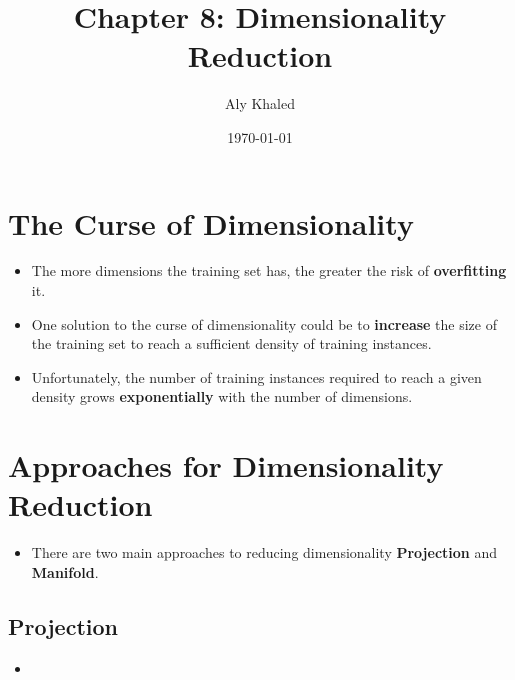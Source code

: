 \documentclass{article}
\title{Chapter 8: Dimensionality Reduction}
\author{Aly Khaled}
\date{\today}
\begin{document}
 
    \maketitle
    \section{The Curse of Dimensionality}
    \begin{itemize}
    	\item The more dimensions the training set has, the greater the risk of \textbf{overfitting} it.
    	\item One solution to the curse of dimensionality could be to \textbf{increase} the size of the training set to reach a sufficient density of training instances.
    	\item Unfortunately, the number of training instances required to reach a given density grows \textbf{exponentially} with the number of dimensions.
    \end{itemize}
    \section{Approaches for Dimensionality Reduction}
    \begin{itemize}
    	\item There are two main approaches to reducing dimensionality \textbf{Projection} and \textbf{Manifold}.
	\end{itemize}
	\subsection{Projection}
	\begin{itemize}
		\item 
	\end{itemize}	        
    
\end{document}
